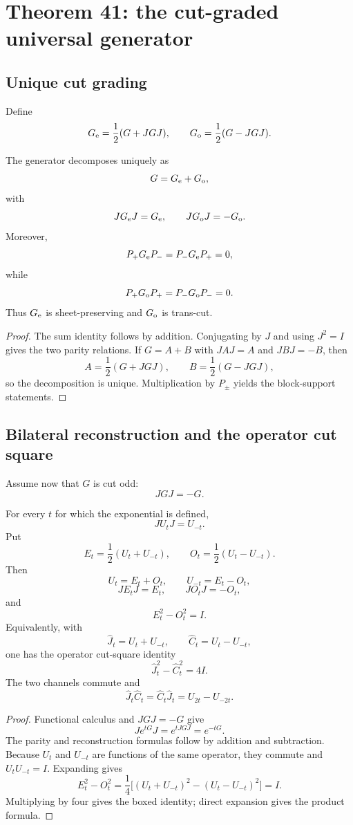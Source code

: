\section{Theorem 41: the cut-graded universal generator}

\subsection{Unique cut grading}

Define
\[
 G_{\mathrm e}=\frac12(G+JGJ),
 \qquad
 G_{\mathrm o}=\frac12(G-JGJ).
\]

\begin{theorem}\label{thm:t41grading}
The generator decomposes uniquely as
\[
 G=G_{\mathrm e}+G_{\mathrm o},
\]
with
\[
 JG_{\mathrm e} J=G_{\mathrm e},
 \qquad
 JG_{\mathrm o} J=-G_{\mathrm o}.
\]
Moreover,
\[
 P_+G_{\mathrm e} P_-=P_-G_{\mathrm e} P_+=0,
\]
while
\[
 P_+G_{\mathrm o} P_+=P_-G_{\mathrm o} P_-=0.
\]
Thus $G_{\mathrm e}$ is sheet-preserving and $G_{\mathrm o}$ is trans-cut.
\end{theorem}

\begin{proof}
The sum identity follows by addition. Conjugating by $J$ and using $J^2=I$ gives the two parity relations. If $G=A+B$ with $JAJ=A$ and $JBJ=-B$, then
\[
 A=\frac12(G+JGJ),\qquad B=\frac12(G-JGJ),
\]
so the decomposition is unique. Multiplication by $P_\pm$ yields the block-support statements.
\end{proof}

\subsection{Bilateral reconstruction and the operator cut square}

Assume now that $G$ is cut odd:
\[
 JGJ=-G.
\]

\begin{theorem}\label{thm:t41bilateral}
For every $t$ for which the exponential is defined,
\[
 JU_tJ=U_{-t}.
\]
Put
\[
 E_t=\frac12(U_t+U_{-t}),
 \qquad
 O_t=\frac12(U_t-U_{-t}).
\]
Then
\[
 U_t=E_t+O_t,
 \qquad
 U_{-t}=E_t-O_t,
\]
\[
 JE_tJ=E_t,
 \qquad
 JO_tJ=-O_t,
\]
and
\[
 E_t^2-O_t^2=I.
\]
Equivalently, with
\[
 \widehat J_t=U_t+U_{-t},
 \qquad
 \widehat C_t=U_t-U_{-t},
\]
one has the operator cut-square identity
\[
 \boxed{\widehat J_t^2-\widehat C_t^2=4I.}
\]
The two channels commute and
\[
 \widehat J_t\widehat C_t
 =\widehat C_t\widehat J_t
 =U_{2t}-U_{-2t}.
\]
\end{theorem}

\begin{proof}
Functional calculus and $JGJ=-G$ give
\[
 Je^{tG}J=e^{tJGJ}=e^{-tG}.
\]
The parity and reconstruction formulas follow by addition and subtraction. Because $U_t$ and $U_{-t}$ are functions of the same operator, they commute and $U_tU_{-t}=I$. Expanding gives
\[
 E_t^2-O_t^2
 =\frac14\bigl[(U_t+U_{-t})^2-(U_t-U_{-t})^2\bigr]=I.
\]
Multiplying by four gives the boxed identity; direct expansion gives the product formula.
\end{proof}

